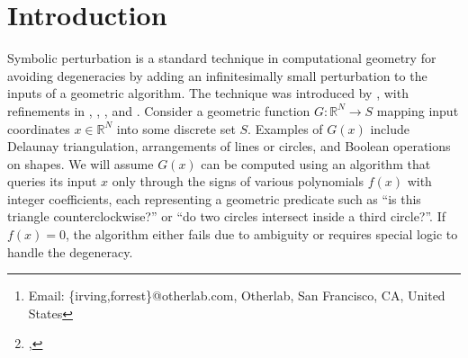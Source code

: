 \documentclass[11pt]{article}
\title{\titleformat{A deterministic pseudorandom perturbation scheme for arbitrary polynomial predicates}}
\author{Geoffrey Irving\thanks{Email: \{irving,forrest\}@otherlab.com, Otherlab, San Francisco, CA, United States}
  \and Forrest Green$^*$}
\date{Version 1, \today}
\author{Geoffrey Irving,%
          \thanks{\affil{Otherlab},
                  \email{\{irving,forrest\}@otherlab.com}}\,
          Forrest Green\footnotemark[1]}
\newcommand{\R}{\mathbb{R}}
\begin{document}
\ifnum {}
  \linenumbers
\fi
\maketitle

\begin{abstract}
We present a symbolic perturbation scheme for arbitrary polynomial geometric predicates which combines the benefits of
Emiris and Canny's simple randomized linear perturbation scheme with Yap's multiple infinitesimal scheme for general predicates.
Like the randomized scheme, our method accepts black box polynomial functions as input.  For nonmaliciously chosen predicates,
our method is as fast as the linear scheme, scaling reasonably with the degree of the polynomial even for fully
degenerate input.  Like Yap's scheme, the computed sign is deterministic, never requiring an algorithmic restart (assuming a
high quality pseudorandom generator), and works for arbitrary predicates with no knowledge of their structure.  We also apply
our technique to exactly or nearly exactly rounded constructions that work correctly for degenerate input, using l'H\^opital's
rule to compute the necessary singular limits.  Our prototype implementation is available as open source, together with example
algorithms for Delaunay triangulation and Boolean operations on polygons and circular arcs in the plane.
\end{abstract}

\section{Introduction}

Symbolic perturbation is a standard technique in computational geometry for avoiding degeneracies by
adding an infinitesimally small perturbation to the inputs of a geometric algorithm.  The technique was introduced by
\cite{edelsbrunner1990simulation}, with refinements in \cite{yap1990symbolic}, \cite{emiris1992efficient}, \cite{emiris1995general},
and \cite{seidel1998nature}.  Consider a geometric function $G : \R^N \to S$ mapping input coordinates $x \in \R^N$ into
some discrete set $S$.  Examples of $G(x)$ include Delaunay triangulation, arrangements of lines or circles, and Boolean operations
on shapes.  We will assume $G(x)$ can be computed using an algorithm that queries its input $x$ only through the
signs of various polynomials $f(x)$ with integer coefficients, each representing a geometric predicate such as
``is this triangle counterclockwise?'' or ``do two circles intersect inside a third circle?''.  If $f(x) = 0$, the algorithm
either fails due to ambiguity or requires special logic to handle the degeneracy.
\end{document}
